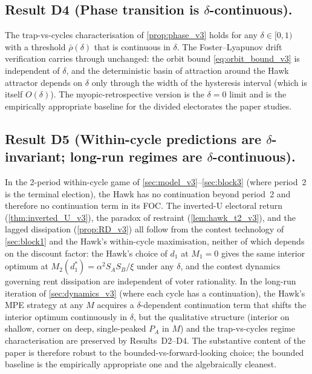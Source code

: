 \documentclass[11pt,twoside]{extarticle}
\begin{document}
\subsection*{Result D4 (Phase transition is $\delta$-continuous).} The trap-vs-cycles characterisation of \autoref{prop:phase_v3} holds for any $\delta\in[0,1)$ with a threshold $\bar\rho(\delta)$ that is continuous in $\delta$. The Foster--Lyapunov drift verification carries through unchanged: the orbit bound \eqref{eq:orbit_bound_v3} is independent of $\delta$, and the deterministic basin of attraction around the Hawk attractor depends on $\delta$ only through the width of the hysteresis interval (which is itself $O(\delta)$). The myopic-retrospective version is the $\delta=0$ limit and is the empirically appropriate baseline for the divided electorates the paper studies.

\subsection*{Result D5 (Within-cycle predictions are $\delta$-invariant; long-run regimes are $\delta$-continuous).} In the 2-period within-cycle game of \autoref{sec:model_v3}--\autoref{sec:block3} (where period~2 is the terminal election), the Hawk has no continuation beyond period~2 and therefore no continuation term in its FOC. The inverted-U electoral return (\autoref{thm:inverted_U_v3}), the paradox of restraint (\autoref{lem:hawk_t2_v3}), and the lagged dissipation (\autoref{prop:RD_v3}) all follow from the contest technology of \autoref{sec:block1} and the Hawk's within-cycle maximisation, neither of which depends on the discount factor: the Hawk's choice of $d_1$ at $M_1=0$ gives the same interior optimum at $M_2(d_1^*)=\alpha^2 S_A S_B/\xi$ under any $\delta$, and the contest dynamics governing rent dissipation are independent of voter rationality. In the long-run iteration of \autoref{sec:dynamics_v3} (where each cycle has a continuation), the Hawk's MPE strategy at any $M$ acquires a $\delta$-dependent continuation term that shifts the interior optimum continuously in $\delta$, but the qualitative structure (interior on shallow, corner on deep, single-peaked $P_A$ in $M$) and the trap-vs-cycles regime characterisation are preserved by Results~D2--D4. The substantive content of the paper is therefore robust to the bounded-vs-forward-looking choice; the bounded baseline is the empirically appropriate one and the algebraically cleanest.

\end{document}

